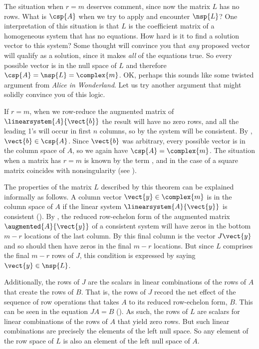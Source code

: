 %
The situation when $r=m$ deserves comment, since now the matrix $L$ has no rows.  What is $\csp{A}$ when we try to apply  and encounter $\nsp{L}$?  One interpretation of this situation is that $L$ is the coefficient matrix of a homogeneous system that has no equations.  How hard is it to find a solution vector to this system?  Some thought will convince you that {\em any} proposed vector will qualify as a solution, since it makes {\em all} of the equations true.  So every possible vector is in the null space of $L$ and therefore $\csp{A}=\nsp{L}=\complex{m}$.  OK, perhaps this sounds like some twisted argument from {\sl Alice in Wonderland}.  Let us try another argument that might solidly convince you of this logic.\par
%
If $r=m$, when we row-reduce the augmented matrix of $\linearsystem{A}{\vect{b}}$ the result will have no zero rows, and all the leading 1's will occur in first $n$ columns, so by  the system will be consistent.  By , $\vect{b}\in\csp{A}$.  Since $\vect{b}$ was arbitrary, every possible vector is in the column space of $A$, so we again have $\csp{A}=\complex{m}$.  The situation when a matrix has $r=m$ is known by the term , and in the case of a square matrix coincides with nonsingularity (see ).\par
%
The properties of the matrix $L$ described by this theorem can be explained informally as follows.  A column vector $\vect{y}\in\complex{m}$ is in the column space of $A$ if the linear system $\linearsystem{A}{\vect{y}}$ is consistent ().  By , the reduced row-echelon form of the augmented matrix $\augmented{A}{\vect{y}}$ of a consistent system will have zeros in the bottom $m-r$ locations of the last column.  By  this final column is the vector $J\vect{y}$ and so should then have zeros in the final $m-r$ locations.  But since $L$ comprises the final $m-r$ rows of $J$, this condition is expressed by saying $\vect{y}\in\nsp{L}$.\par
%
Additionally, the rows of $J$ are the scalars in linear combinations of the rows of $A$ that create the rows of $B$.  That is, the rows of $J$ record the net effect of the sequence of row operations that takes $A$ to its reduced row-echelon form, $B$.  This can be seen in the equation $JA=B$ ().  As such, the rows of $L$ are scalars for linear combinations of the rows of $A$ that yield zero rows.  But such linear combinations are precisely the elements of the left null space.  So any element of the row space of $L$ is also an element of the left null space of $A$.
